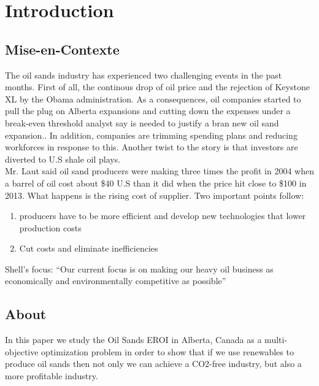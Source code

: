 \documentclass[12pt]{article}
\begin{document}
\maketitle
\tableofcontents
\newpage

\section{Introduction}

\subsection{Mise-en-Contexte}
The oil sands industry has experienced two challenging events in the past months. First of all, the continous drop of oil price and the rejection of Keystone XL by the Obama administration. As a consequences, oil companies started to pull the plug on Alberta expansions and cutting down the expenses under a break-even threshold analyst say is needed to justify a bran new oil sand expansion.. In addition, companies are trimming spending plans and reducing workforces in response to this. Another twist to the story is that investors are diverted to U.S shale oil plays.  \\

  Mr. Laut said oil sand producers were making three times the profit in 2004 when a barrel of oil cost about \$40 U.S than it did when the price hit close to \$100 in 2013. What happens is the rising cost of supplier. Two important points follow:
  
  \begin{enumerate}
  \item producers have to be more efficient and develop new technologies that lower production costs
  \item Cut costs and eliminate inefficiencies
  \end{enumerate}

Shell's focus: ``Our current focus is on making our heavy oil business as economically and environmentally competitive as possible''

\subsection{About}
In this paper we study the Oil Sands EROI in Alberta, Canada as a multi-objective optimization problem in order to show that if we use renewables to produce oil sands then not only we can achieve a CO2-free industry, but also a more profitable industry. 
\end{document}
